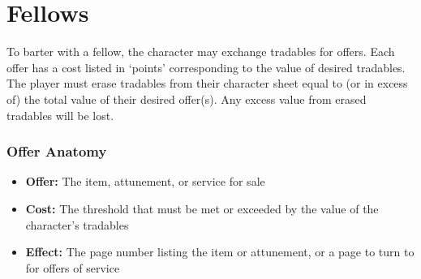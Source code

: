 \section{Fellows}
To barter with a fellow, the character may exchange tradables for offers. Each offer has a cost listed in ‘points’ corresponding to the value of desired tradables. The player must erase tradables from their character sheet equal to (or in excess of) the total value of their desired offer(s). Any excess value from erased tradables will be lost.

\subsubsection*{Offer Anatomy}
\begin{itemize}
\item \textbf{Offer:} The item, attunement, or service for sale
\item \textbf{Cost:} The threshold that must be met or exceeded by the value of the character’s tradables
\item \textbf{Effect:} The page number listing the item or attunement, or a page to turn to for offers of service
\end{itemize}



